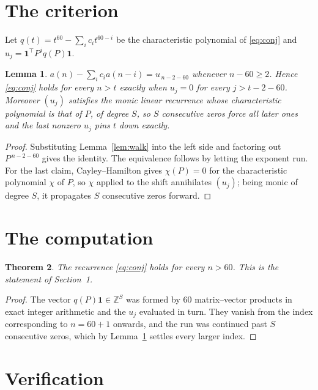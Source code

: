 \documentclass[11pt,a4paper]{article}
\theoremstyle{plain}
\newtheorem{theorem}{Theorem}
\newtheorem{lemma}[theorem]{Lemma}
\theoremstyle{definition}
\begin{document}
\section{The criterion}

Let $q(t)=t^{60}-\sum_i c_i t^{60-i}$ be the characteristic polynomial of
\eqref{eq:conj} and $u_j=\mathbf{1}^{\!\top}P^{j}q(P)\mathbf{1}$.

\begin{lemma}\label{lem:crit}
$a(n)-\sum_i c_i a(n-i)=u_{\,n-2-60}$ whenever $n-60\ge2$. Hence
\eqref{eq:conj} holds for every $n>t$ exactly when $u_j=0$ for every
$j>t-2-60$. Moreover $(u_j)$ satisfies the monic linear recurrence whose
characteristic polynomial is that of $P$, of degree $S$, so $S$ consecutive zeros force all
later ones and the last nonzero $u_j$ pins $t$ down exactly.
\end{lemma}

\begin{proof}
Substituting Lemma~\ref{lem:walk} into the left side and factoring out
$P^{\,n-2-60}$ gives the identity. The equivalence follows by letting the exponent
run. For the last claim, Cayley--Hamilton gives $\chi(P)=0$ for the characteristic
polynomial $\chi$ of $P$, so $\chi$ applied to the shift annihilates $(u_j)$; being monic of
degree $S$, it propagates $S$ consecutive zeros forward.
\end{proof}

\section{The computation}

\begin{theorem}
The recurrence \eqref{eq:conj} holds for every $n>60$. This is the statement of
Section~1.
\end{theorem}

\begin{proof}
The vector $q(P)\mathbf{1}\in\mathbb{Z}^{S}$ was formed by $60$ matrix--vector
products in exact integer arithmetic and the $u_j$ evaluated in turn. They vanish from the
index corresponding to $n=60+1$ onwards, and the run was continued past $S$ consecutive
zeros, which by Lemma~\ref{lem:crit} settles every larger index.
\end{proof}

\section{Verification}
\end{document}
